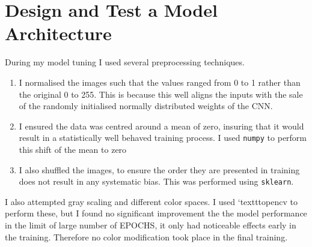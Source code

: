 \documentclass[letterpaper,12pt]{article}
\begin{document}
\section{Design and Test a Model Architecture}
During my model tuning I used several preprocessing techniques.
\begin{enumerate}
\item I normalised the images such that the values ranged from 0 to 1 rather than the original 0 to 255. This is because this well aligns the inputs with the sale of the randomly initialised normally distributed weights of the CNN.
\item I ensured the data was centred around a mean of zero, insuring that it would result in a statistically well behaved training process. I used \texttt{numpy} to perform this shift of the mean to zero
\item I also shuffled the images, to ensure the order they are presented in training does not result in any systematic bias. This was performed using \texttt{sklearn}. 
\end{enumerate}
I also attempted gray scaling and different color spaces. I used `texttt{opencv} to perform these, but I found no significant improvement the the model performance in the limit of large number of EPOCHS, it only had noticeable effects early in the training. Therefore no color modification took place in the final training.
\end{document}

